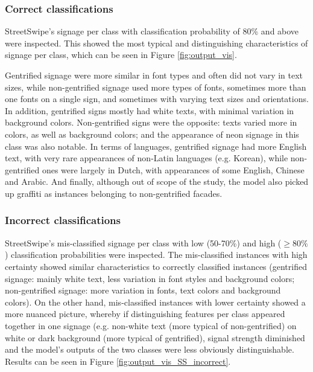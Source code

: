 \subsubsection{Correct classifications}

StreetSwipe's signage per class with classification probability of 80\% and above were inspected. This showed the most typical and distinguishing characteristics of signage per class, which can be seen in Figure \ref{fig:output_vis}.

Gentrified signage were more similar in font types and often did not vary in text sizes, while non-gentrified signage used more types of fonts, sometimes more than one fonts on a single sign, and sometimes with varying text sizes and orientations. In addition, gentrified signs mostly had white texts, with minimal variation in background colors. Non-gentrified signs were the opposite: texts varied more in colors, as well as background colors; and the appearance of neon signage in this class was also notable. In terms of languages, gentrified signage had more English text, with very rare appearances of non-Latin languages (e.g. Korean), while non-gentrified ones were largely in Dutch, with appearances of some English, Chinese and Arabic. And finally, although out of scope of the study, the model also picked up graffiti as instances belonging to non-gentrified facades.


\subsubsection{Incorrect classifications} 

StreetSwipe's mis-classified signage per class with low (50-70\%) and high ($ \geq 80\% $) classification probabilities were inspected. The mis-classified instances with high certainty showed similar characteristics to correctly classified instances (gentrified signage: mainly white text, less variation in font styles and background colors; non-gentrified signage: more variation in fonts, text colors and background colors). On the other hand, mis-classified instances with lower certainty showed a more nuanced picture, whereby if distinguishing features per class appeared together in one signage (e.g. non-white text (more typical of non-gentrified) on white or dark background (more typical of gentrified), signal strength diminished and the model's outputs of the two classes were less obviously distinguishable. Results can be seen in Figure \ref{fig:output_vis_SS_incorrect}.


